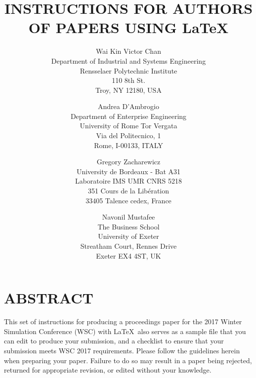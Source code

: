 \documentclass{wscpaperproc}
\theoremstyle{wsc}
\begin{document}
%
%

\title{INSTRUCTIONS FOR AUTHORS OF PAPERS USING \LaTeX}

\author{Wai Kin Victor Chan\\ [12pt]
Department of Industrial and Systems Engineering \\
Rensselaer Polytechnic Institute\\
110 8th St.\\
Troy, NY 12180, USA\\
\and
Andrea D'Ambrogio\\[12pt]
Department of Enterprise Engineering\\
University of Rome Tor Vergata\\
Via del Politecnico, 1\\
Rome, I-00133, ITALY\\
\and
Gregory Zacharewicz\\ [12pt]
University de Bordeaux - Bat A31\\
Laboratoire IMS UMR CNRS 5218\\
351 Cours de la Libération\\
33405 Talence cedex, France\\
\and
Navonil Mustafee\\ [12pt]
The Business School\\
University of Exeter\\
Streatham Court, Rennes Drive\\
Exeter EX4 4ST, UK
}






\maketitle

\section*{ABSTRACT}
This set of instructions for producing a proceedings paper for the 2017
Winter Simulation Conference (WSC) with \LaTeX\ also serves as a sample file that you can edit to
produce your submission, and a checklist to ensure that your submission
meets WSC 2017 requirements. Please follow the guidelines herein when preparing your
paper. Failure to do so may result in a paper being rejected, returned for
appropriate revision, or edited without your knowledge.
\end{document}
